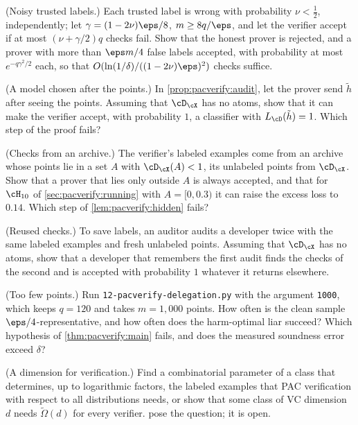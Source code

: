 \begin{refsection}
\begin{exercises}
\item \variation\hard (Noisy trusted labels.) Each trusted label is wrong with probability $\nu<\frac12$, independently; let $\gamma=(1-2\nu)\eps/8$, $m\ge8q/\eps$, and let the verifier accept if at most $(\nu+\gamma/2)q$ checks fail. Show that the honest prover is rejected, and a prover with more than $\eps m/4$ false labels accepted, with probability at most $e^{-q\gamma^2/2}$ each, so that $O(\ln(1/\delta)/((1-2\nu)\eps)^2)$ checks suffice. \label{ex:pacverify:noisy}

\item \attack (A model chosen after the points.) In \cref{prop:pacverify:audit}, let the prover send $\tilde h$ after seeing the points. Assuming that $\cD_\cX$ has no atoms, show that it can make the verifier accept, with probability $1$, a classifier with $L_\cD(\tilde h)=1$. Which step of the proof fails?\label{ex:pacverify:commit}

\item \attack (Checks from an archive.) The verifier's labeled examples come from an archive whose points lie in a set $A$ with $\cD_\cX(A)<1$, its unlabeled points from $\cD_\cX$. Show that a prover that lies only outside $A$ is always accepted, and that for $\cH_{10}$ of \cref{sec:pacverify:running} with $A=[0,0.3)$ it can raise the excess loss to $0.14$. Which step of \cref{lem:pacverify:hidden} fails?\label{ex:pacverify:archive}

\item \attack (Reused checks.) To save labels, an auditor audits a developer twice with the same labeled examples and fresh unlabeled points. Assuming that $\cD_\cX$ has no atoms, show that a developer that remembers the first audit finds the checks of the second and is accepted with probability $1$ whatever it returns elsewhere.\label{ex:pacverify:reuse}

\item \simulation (Too few points.) Run \texttt{12-pacverify-delegation.py} with the argument \texttt{1000}, which keeps $q=120$ and takes $m=1{,}000$ points. How often is the clean sample $\eps/4$-representative, and how often does the harm-optimal liar succeed? Which hypothesis of \cref{thm:pacverify:main} fails, and does the measured soundness error exceed $\delta$?\label{ex:pacverify:fewpoints}

\item \research (A dimension for verification.) Find a combinatorial parameter of a class that determines, up to logarithmic factors, the labeled examples that PAC verification with respect to all distributions needs, or show that some class of VC dimension $d$ needs $\tilde\Omega(d)$ for every verifier. \Textcite{MutrejaShafer2023} pose the question; it is open.\label{ex:pacverify:dimension}


\end{exercises}
\end{refsection}
